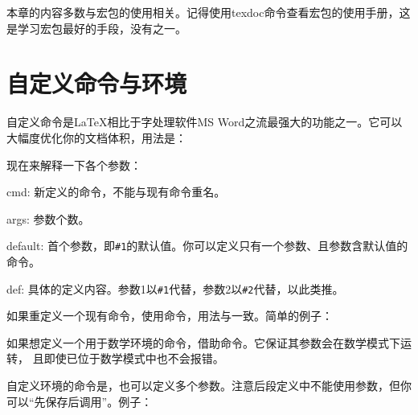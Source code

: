 本章的内容多数与宏包的使用相关。记得使用texdoc命令查看宏包的使用手册，这是学习宏包最好的手段，没有之一。

\section{自定义命令与环境}
\label{sec:newcommand}
自定义命令是\LaTeX 相比于字处理软件MS Word之流最强大的功能之一。它可以大幅度优化你的文档体积，用法是：

现在来解释一下各个参数：
\begin{para}
\item[cmd:] 新定义的命令，不能与现有命令重名。
\item[args:] 参数个数。
\item[default:] 首个参数，即\texttt{\#{}1}的默认值。你可以定义只有一个参数、且参数含默认值的命令。
\item[def:] 具体的定义内容。参数1以\texttt{\#{}1}代替，参数2以\texttt{\#{}2}代替，以此类推。
\end{para}

如果重定义一个现有命令，使用命令，用法与一致。简单的例子：
\begin{latex}
\newcommand{\concept}[1]{\textbf{#1}}
\newcommand{\cop}[2][]{\textbf{#2}}}
\end{latex}

如果想定义一个用于数学环境的命令，借助命令。它保证其参数会在数学模式下运转， 且即使已位于数学模式中也不会报错。
\begin{latex}
\renewcommand\qedsymbol{\ensuremath{\Box}}
\end{latex}

自定义环境的命令是，也可以定义多个参数。注意后段定义中不能使用参数，但你可以“先保存后调用”。例子：
\begin{latex}
\newenvironment{QuoteEnv}[2][]
    {\newcommand\Qauthor{#1}\newcommand\Qref{#2}}
    {\medskip\begin{flushright}\small ——~\Qauthor\\
    \emph{\Qref}\end{flushright}}
\end{latex}

